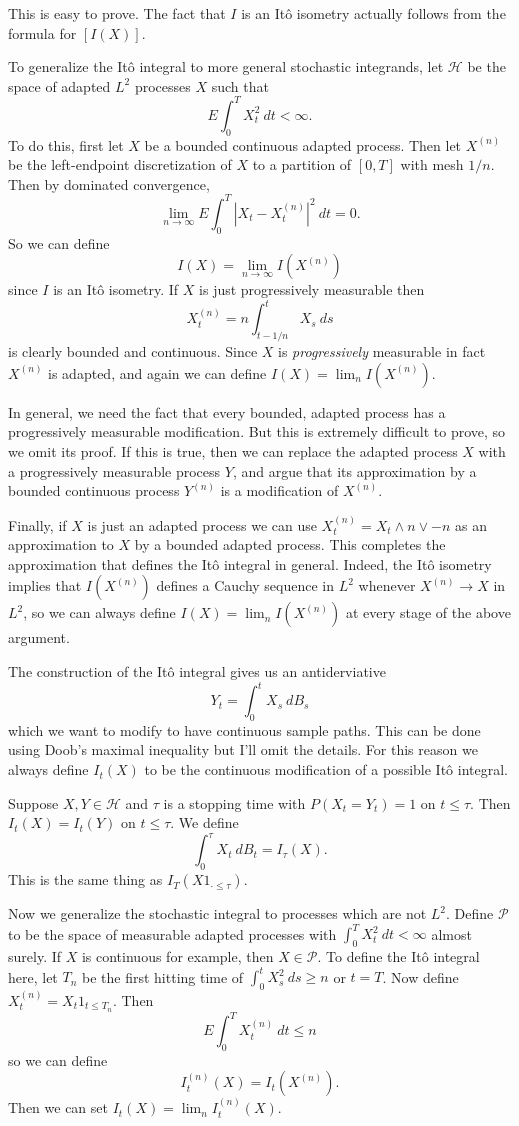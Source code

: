 \documentclass[12pt]{book}
\theoremstyle{definition}
\begin{document}
This is easy to prove. The fact that $I$ is an It\^o isometry actually follows from the formula for $[I(X)]$.

To generalize the It\^o integral to more general stochastic integrands, let $\mathcal H$ be the space of adapted $L^2$ processes $X$ such that
$$E\int_0^T X_t^2 ~dt < \infty.$$
To do this, first let $X$ be a bounded continuous adapted process. Then let $X^{(n)}$ be the left-endpoint discretization of $X$ to a partition of $[0, T]$ with mesh $1/n$.
Then by dominated convergence,
$$\lim_{n \to \infty} E\int_0^T |X_t - X_t^{(n)}|^2 ~dt = 0.$$
So we can define
$$I(X) = \lim_{n \to \infty} I(X^{(n)})$$
since $I$ is an It\^o isometry.
If $X$ is just progressively measurable then
$$X^{(n)}_t = n \int_{t - 1/n}^t X_s ~ds$$
is clearly bounded and continuous. Since $X$ is \emph{progressively} measurable in fact $X^{(n)}$ is adapted, and again we can define $I(X) = \lim_n I(X^{(n)})$.

In general, we need the fact that every bounded, adapted process has a progressively measurable modification.
But this is extremely difficult to prove, so we omit its proof.
If this is true, then we can replace the adapted process $X$ with a progressively measurable process $Y$, and argue that its approximation by a bounded continuous process $Y^{(n)}$ is a modification of $X^{(n)}$.

Finally, if $X$ is just an adapted process we can use $X^{(n)}_t = X_t \wedge n \vee -n$ as an approximation to $X$ by a bounded adapted process.
This completes the approximation that defines the It\^o integral in general.
Indeed, the It\^o isometry implies that $I(X^{(n)})$ defines a Cauchy sequence in $L^2$ whenever $X^{(n)} \to X$ in $L^2$, so we can always define $I(X) = \lim_n I(X^{(n)})$ at every stage of the above argument.

The construction of the It\^o integral gives us an antiderviative
$$Y_t = \int_0^t X_s ~dB_s$$
which we want to modify to have continuous sample paths.
This can be done using Doob's maximal inequality but I'll omit the details.
For this reason we always define $I_t(X)$ to be the continuous modification of a possible It\^o integral.

Suppose $X, Y \in \mathcal H$ and $\tau$ is a stopping time with $P(X_t = Y_t) = 1$ on $t \leq \tau$.
Then $I_t(X) = I_t(Y)$ on $t \leq \tau$.
We define
$$\int_0^\tau X_t ~dB_t = I_\tau(X).$$
This is the same thing as $I_T(X 1_{\cdot \leq \tau})$.

Now we generalize the stochastic integral to processes which are not $L^2$.
Define $\mathcal P$ to be the space of measurable adapted processes with $\int_0^T X_t^2 ~dt < \infty$ almost surely.
If $X$ is continuous for example, then $X \in \mathcal P$.
To define the It\^o integral here, let $T_n$ be the first hitting time of $\int_0^t X_s^2 ~ds \geq n$ or $t = T$.
Now define $X^{(n)}_t = X_t 1_{t \leq T_n}$.
Then
$$E\int_0^T X_t^{(n)} ~dt \leq n$$
so we can define
$$I^{(n)}_t(X) = I_t(X^{(n)}).$$
Then we can set $I_t(X) = \lim_n I^{(n)}_t(X)$.
\end{document}
